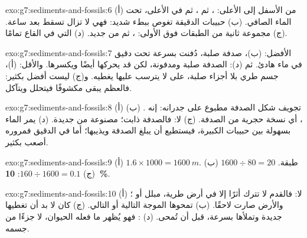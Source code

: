 \begin{solution}{exo:g7:sediments-and-fossils:6}
(أ) من الأسفل إلى الأعلى: ، ثم ، ثم  في الأعلى، تحت
الماء الصافي. (ب) حبيبات  الدقيقة تغوص ببطء شديد: فهي لا تزال تسقط
بعد ساعة. (ج) مجموعة ثانية من الطبقات فوق الأولى: ، ثم  من جديد.
(د)  التي في القاع تمامًا.
\end{solution}

\begin{solution}{exo:g7:sediments-and-fossils:7}
الأفضل: (ب)، صدفة صلبة، دُفنت بسرعة تحت  دقيق في ماء هادئ. ثم (د):
الصدفة صلبة ومدفونة، لكن  قد يحركها أيضًا ويكسرها. والأقل: (أ)،
جسم طري بلا أجزاء صلبة، على  لا يترسب عليها  يغطيه. و(ج) ليست أفضل
بكثير: فالعظم يبقى مكشوفًا فيتحلل ويتآكل.
\end{solution}

\begin{solution}{exo:g7:sediments-and-fossils:8}
(أ) تجويف شكل الصدفة مطبوع على جدرانه: إنه . (ب) ، أي نسخة
حجرية من الصدفة. (ج) لا: فالصدفة ذابت؛  مصنوعة من  جديدة.
(د) يمر الماء بسهولة بين حبيبات  الكبيرة، فيستطيع أن يبلغ الصدفة
ويذيبها؛ أما في  الدقيق فمروره أصعب بكثير.
\end{solution}

\begin{solution}{exo:g7:sediments-and-fossils:9}
(أ) $1.6 \times 1000 = \qty{1600}{m}$. (ب) $1600 \div 80 = 20$ طبقة.
(ج) $160 \div 1600 = 0.1$: \textbf{10~\%}.
\end{solution}

\begin{solution}{exo:g7:sediments-and-fossils:10}
(أ) لا: فالقدم لا تترك أثرًا إلا في أرض طرية،  مبلل أو ؛ والأرض
صارت  لاحقًا. (ب) تمحوها الموجة التالية أو  التالي. (ج) كان
لا بد أن تغطيها  جديدة وتملأها بسرعة، قبل أن تُمحى. (د) :
فهو يُظهر ما فعله الحيوان، لا جزءًا من جسمه.
\end{solution}

